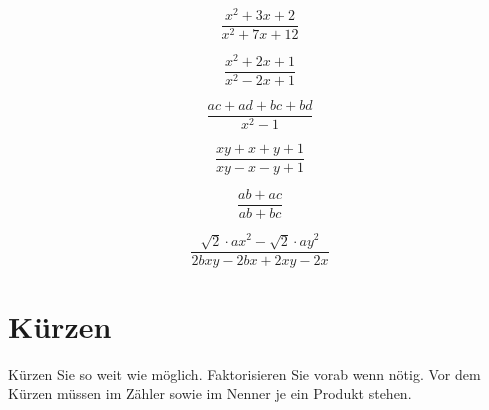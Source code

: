 \begin{bbwAufgabenBlock}
\item $$\frac{x^2+3x+2}{x^2+7x+12}$$

\item $$\frac{x^2+2x+1}{x^2-2x+1}$$

\item $$\frac{ac+ad+bc+bd}{x^2-1}$$

\item $$\frac{xy+x+y+1}{xy-x-y+1}$$

\item $$\frac{ab+ac}{ab+bc}$$

\item $$\frac{\sqrt{2}\cdot{}ax^2-\sqrt{2}\cdot{}ay^2}{2bxy-2bx+2xy-2x}$$


\end{bbwAufgabenBlock}
\newpage
\section{Kürzen}
Kürzen Sie so weit wie möglich. Faktorisieren Sie vorab wenn nötig.
Vor dem Kürzen müssen im Zähler sowie im Nenner je ein Produkt stehen.

